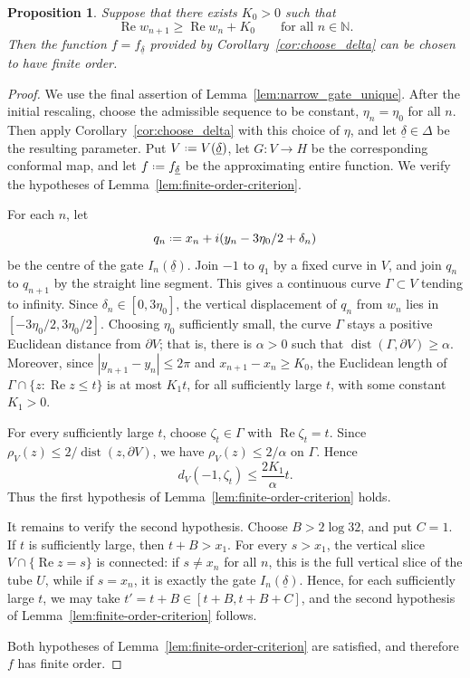 \documentclass[a4paper, 11pt, reqno]{amsart}
\numberwithin{equation}{section}
\theoremstyle{plain}
\newtheorem{proposition}[theorem]{Proposition}
\newcommand*{\defeq}{\mathrel{\vcenter{\baselineskip0.5ex \lineskiplimit0pt
 \hbox{\scriptsize.}\hbox{\scriptsize.}}}=}
\theoremstyle{remark}
\newcommand{\N}{{\mathbb{N}}}
\newcommand{\uldelta}{\underline{\delta}}
\newcommand{\Rea}{\operatorname{Re }}
\newcommand{\dist}{\operatorname{dist}}
\begin{document}
\begin{proposition}\label{prop:finite_order}
	Suppose that there exists $K_0>0$ such that
	\begin{equation}\label{eq_separation}
		\Rea w_{n+1}\ge \Rea w_n + K_0 \qquad \text{for all }n\in\N.
	\end{equation}
	Then the function $f=f_{\uldelta}$ provided by Corollary~\ref{cor:choose_delta}
	can be chosen to have finite order.
\end{proposition}

\begin{proof}
	We use the final assertion of Lemma~\ref{lem:narrow_gate_unique}. After the initial rescaling, choose the admissible sequence to be constant, \(\eta_n=\eta_0\) for all \(n\). Then apply Corollary~\ref{cor:choose_delta} with this choice of \(\eta\), and let \(\uldelta\in\Delta\) be the resulting parameter. Put \(V\defeq V(\uldelta)\), let \(G\colon V\to H\) be the corresponding conformal map, and let \(f\defeq f_{\uldelta}\) be the approximating entire function. We verify the hypotheses of Lemma~\ref{lem:finite-order-criterion}.
	
	For each \(n\), let
	\[
	q_n\defeq x_n+i(y_n-3\eta_0/2+\delta_n)
	\]
	be the centre of the gate \(I_n(\uldelta)\). Join \(-1\) to \(q_1\) by a fixed curve in $V$, and join \(q_n\) to \(q_{n+1}\) by the straight line segment. This gives a continuous curve \(\Gamma\subset V\) tending to infinity. Since \(\delta_n\in[0,3\eta_0]\), the vertical displacement of \(q_n\) from \(w_n\) lies in \([-3\eta_0/2,3\eta_0/2]\). Choosing \(\eta_0\) sufficiently small, the curve \(\Gamma\) stays a positive Euclidean distance from \(\partial V\); that is, there is \(\alpha>0\) such that \(\dist(\Gamma,\partial V)\ge\alpha\). Moreover, since \(|y_{n+1}-y_n|\le2\pi\) and \(x_{n+1}-x_n\ge K_0\), the Euclidean length of \(\Gamma\cap\{z:\Rea z\le t\}\) is at most \(K_1t\), for all sufficiently large \(t\), with some constant \(K_1>0\).
	
	
	For every sufficiently large \(t\), choose \(\zeta_t\in\Gamma\) with \(\Rea\zeta_t=t\). Since \(\rho_V(z)\le2/\dist(z,\partial V)\), we have \(\rho_V(z)\le2/\alpha\) on \(\Gamma\). Hence
	\[
	d_V(-1,\zeta_t)\le \frac{2K_1}{\alpha}t.
	\]
	Thus the first hypothesis of Lemma~\ref{lem:finite-order-criterion} holds.
	
	It remains to verify the second hypothesis. Choose 
	\(B>2\log32\), and put \(C=1\). If \(t\) is sufficiently large, then
	\(t+B>x_1\). For every \(s>x_1\), the vertical slice
	\(V\cap\{\Rea z=s\}\) is connected: if \(s\ne x_n\) for all \(n\), this is
	the full vertical slice of the tube \(U\), while if \(s=x_n\), it is exactly
	the gate \(I_n(\uldelta)\). Hence, for each sufficiently large \(t\), we may
	take \(t'=t+B\in[t+B,t+B+C]\), and the second hypothesis of
	Lemma~\ref{lem:finite-order-criterion} follows.
	
	Both hypotheses of Lemma~\ref{lem:finite-order-criterion} are satisfied,
	and therefore \(f\) has finite order.
\end{proof}
\end{document}
